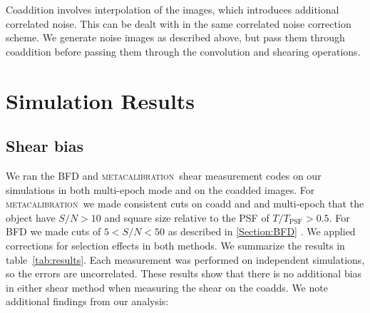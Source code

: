\documentclass[fleqn,useAMS,usenatbib]{mnras}
\newcommand{\snr}{$S/N$}
\newcommand{\mcal}{\textsc{metacalibration}}
\begin{document}
Coaddition involves interpolation of the images, which introduces additional
correlated noise.  This can be dealt with in the same correlated noise
correction scheme.  We generate noise images as described above, but pass them
through coaddition before passing them through the convolution and shearing
operations.


\section{Simulation Results}
\label{Section:Results}

\subsection{Shear bias} We ran the BFD and \mcal\ shear measurement codes on
our simulations in both multi-epoch mode and on the coadded images. For
\mcal\ we made consistent cuts on coadd and and multi-epoch that the object have \snr$ > 10$ and square size relative
to the PSF of $T/T_{\mathrm{PSF}} > 0.5$.
  For BFD we made cuts of $5 < S/N < 50$ as described in \ref{Section:BFD} .
We applied corrections for selection effects in both methods.  We summarize the
results in table~\ref{tab:results}.  Each measurement was performed on
independent simulations, so the errors are uncorrelated.  These results show
that there is no additional bias in either shear method when measuring the
shear on the coadds.  We note additional findings from our
analysis: 
\end{document}

